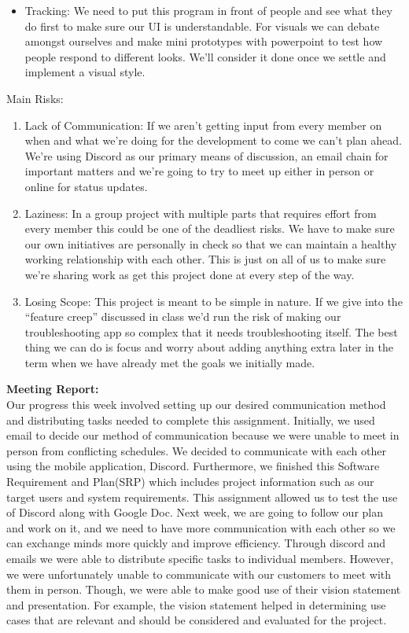 \documentclass[12pt, letterpaper]{article}
\begin{document}
\begin{enumerate}
\begin{itemize}
		\item Tracking: We need to put this program in front of people and see what they do first to make sure our UI is understandable. For visuals we can debate amongst ourselves and make mini prototypes with powerpoint to test how people respond to different looks. We’ll consider it done once we settle and implement a visual style. 
	\end{itemize}
	\end{enumerate}
	Main Risks:	
	\begin{enumerate}
		\item Lack of Communication: If we aren’t getting input from every member on when and what we’re doing for the development to come we can’t plan ahead. We’re using Discord as our primary means of discussion, an email chain for important matters and we’re going to try to meet up either in person or online for status updates. 
		\item Laziness: In a group project with multiple parts that requires effort from every member this could be one of the deadliest risks. We have to make sure our own initiatives are personally in check so that we can maintain a healthy working relationship with each other. This is just on all of us to make sure we’re sharing work as get this project done at every step of the way.
		\item Losing Scope: This project is meant to be simple in nature. If we give into the “feature creep” discussed in class we’d run the risk of making our troubleshooting app so complex that it needs troubleshooting itself. The best thing we can do is focus and worry about adding anything extra later in the term when we have already met the goals we initially made. 
	\end{enumerate}
\textbf{Meeting Report:}
\\Our progress this week involved setting up our desired communication method and distributing tasks needed to complete this assignment. Initially, we used email to decide our method of communication because we were unable to meet in person from conflicting schedules. We decided to communicate with each other using the mobile application, Discord.  Furthermore, we finished this Software Requirement and Plan(SRP) which includes project information such as our target users and system requirements. This assignment allowed us to test the use of Discord along with Google Doc. 
Next week, we are going to follow our plan and work on it, and we need to have more communication with each other so we can exchange minds more quickly and improve efficiency. 
Through discord and emails we were able to distribute specific tasks to individual members. However, we were unfortunately unable to communicate with our customers to meet with them in person. Though, we were able to make good use of their vision statement and presentation. For example, the vision statement helped in determining use cases that are relevant and should be considered and evaluated for the project.
\\


\end{document}
